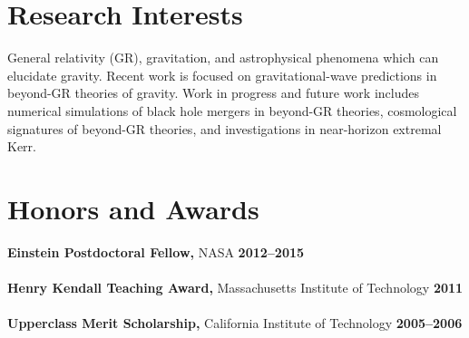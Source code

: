 \documentclass[margin,line]{res}
\begin{document}
\begin{resume}
\vspace{-1em}

\section{\sc Research Interests}
General relativity (GR), gravitation, and astrophysical phenomena which can
elucidate gravity. Recent work is focused on gravitational-wave predictions
in beyond-GR theories of gravity. Work in progress and
future work includes numerical simulations of black hole mergers in
beyond-GR theories, cosmological signatures of beyond-GR theories, and
investigations in near-horizon extremal Kerr.

\section{\sc Honors and Awards}
{\bf Einstein Postdoctoral Fellow,} NASA \hfill {\bf 2012--2015}\\
\\
{\bf Henry Kendall Teaching Award,} Massachusetts Institute of Technology \hfill {\bf 2011}\\
\\
{\bf Upperclass Merit Scholarship,} California Institute of Technology \hfill {\bf 2005--2006}\\

\vspace{-1em}


\end{resume}
\end{document}
